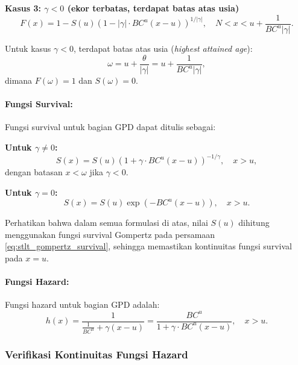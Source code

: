 \textbf{Kasus 3: $\gamma < 0$ (ekor terbatas, terdapat batas atas usia)}
\begin{equation}
F(x) = 1 - S(u) \left(1 - |\gamma| \cdot BC^u(x-u)\right)^{1/|\gamma|}, \quad N < x < u + \frac{1}{BC^u|\gamma|}.
\label{eq:stlt_gpd_cdf_negative}
\end{equation}

Untuk kasus $\gamma < 0$, terdapat batas atas usia (\textit{highest attained age}):
\begin{equation}
\omega = u + \frac{\theta}{|\gamma|} = u + \frac{1}{BC^u|\gamma|},
\label{eq:stlt_omega}
\end{equation}
dimana $F(\omega) = 1$ dan $S(\omega) = 0$.

\paragraph{Fungsi Survival:}

Fungsi survival untuk bagian GPD dapat ditulis sebagai:

\textbf{Untuk $\gamma \neq 0$:}
\begin{equation}
S(x) = S(u) \left(1 + \gamma \cdot BC^u(x-u)\right)^{-1/\gamma}, \quad x > u,
\label{eq:stlt_gpd_survival_general}
\end{equation}
dengan batasan $x < \omega$ jika $\gamma < 0$.

\textbf{Untuk $\gamma = 0$:}
\begin{equation}
S(x) = S(u) \exp\left(-BC^u(x-u)\right), \quad x > u.
\label{eq:stlt_gpd_survival_zero}
\end{equation}

Perhatikan bahwa dalam semua formulasi di atas, nilai $S(u)$ dihitung menggunakan fungsi survival Gompertz pada persamaan \eqref{eq:stlt_gompertz_survival}, sehingga memastikan kontinuitas fungsi survival pada $x = u$.

\paragraph{Fungsi Hazard:}

Fungsi hazard untuk bagian GPD adalah:
\begin{equation}
h(x) = \frac{1}{\frac{1}{BC^u} + \gamma(x-u)} = \frac{BC^u}{1 + \gamma \cdot BC^u(x-u)}, \quad x > u.
\label{eq:stlt_gpd_hazard}
\end{equation}

\subsubsection{Verifikasi Kontinuitas Fungsi Hazard}

